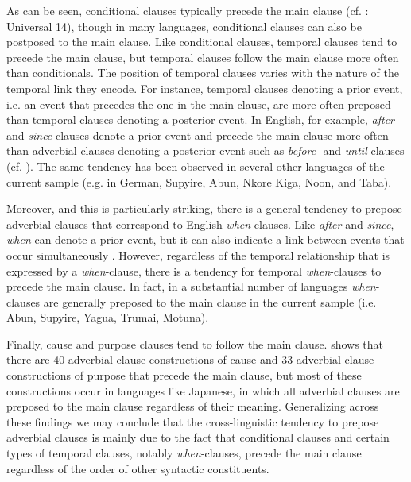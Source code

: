 \documentclass[output=paper]{langsci/langscibook}
\begin{document}
As can be seen, conditional clauses typically precede the main clause (cf. \citealt{Greenberg1963}: Universal 14), though in many languages, conditional clauses can also be postposed to the main clause. Like conditional clauses, temporal clauses tend to precede the main clause, but temporal clauses follow the main clause more often than conditionals. The position of temporal clauses varies with the nature of the temporal link they encode. For instance, temporal clauses denoting a prior event, i.e. an event that precedes the one in the main clause, are more often preposed than temporal clauses denoting a posterior event. In English, for example, \textit{after}- and \textit{since}-clauses denote a prior event and precede the main clause more often than adverbial clauses denoting a posterior event such as \textit{before}- and \textit{until}-clauses (cf. \citealt{Diessel2008}). The same tendency has been observed in several other languages of the current sample (e.g. in German, Supyire, Abun, Nkore Kiga, Noon, and Taba). 

Moreover, and this is particularly striking, there is a general tendency to prepose adverbial clauses that correspond to English \textit{when}-clauses. Like \textit{after} and \textit{since}, \textit{when} can denote a prior event, but it can also indicate a link between events that occur simultaneously \citep{Diessel2008}. However, regardless of the temporal relationship that is expressed by a \textit{when}-clause, there is a tendency for temporal \textit{when}-clauses to precede the main clause. In fact, in a substantial number of languages \textit{when}-clauses are generally preposed to the main clause in the current sample (i.e. Abun, Supyire, Yagua, Trumai, Motuna). 

Finally, cause and purpose clauses tend to follow the main clause.  shows that there are 40 adverbial clause constructions of cause and 33 adverbial clause constructions of purpose that precede the main clause, but most of these constructions occur in languages like Japanese, in which all adverbial clauses are preposed to the main clause regardless of their meaning. Generalizing across these findings we may conclude that the cross-linguistic tendency to prepose adverbial clauses is mainly due to the fact that conditional clauses and certain types of temporal clauses, notably \textit{when}-clauses, precede the main clause regardless of the order of other syntactic constituents.
\end{document}
